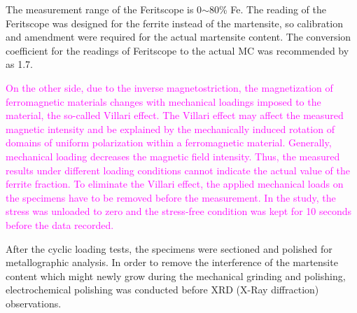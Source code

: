 \documentclass[preprint,5p,twocolumn,10pt,sort&compress]{elsarticle}
\newcommand{\jingyu}[1]{\textcolor{magenta}{#1}}
\begin{document}
The measurement range of the Feritscope is 0$\sim$80\% Fe. The reading of the Feritscope was designed for the ferrite instead of the martensite, so calibration and amendment were required for the actual martensite content. The conversion coefficient for the readings of Feritscope to the actual MC was recommended  by \cite {Talonen2004} as 1.7.

\jingyu{On the other side, due to the inverse magnetostriction, the magnetization of ferromagnetic materials changes with mechanical loadings imposed to the material, the so-called Villari effect. The Villari effect may affect the measured magnetic intensity and be explained by the mechanically induced rotation of domains of uniform polarization within a ferromagnetic material. Generally, mechanical loading decreases the magnetic field intensity. Thus, the measured results under different loading conditions cannot indicate the actual value of the ferrite fraction. To eliminate the Villari effect, the applied mechanical loads on the specimens have to be removed before the measurement. In the study, the stress was unloaded to zero and the stress-free condition was kept for 10 seconds before the data recorded.}


After the cyclic loading tests, the specimens were sectioned and polished for metallographic analysis. In order to remove the interference of the martensite content which might newly grow during the mechanical grinding and polishing, electrochemical polishing was conducted before XRD (X-Ray diffraction) observations.

\end{document}

